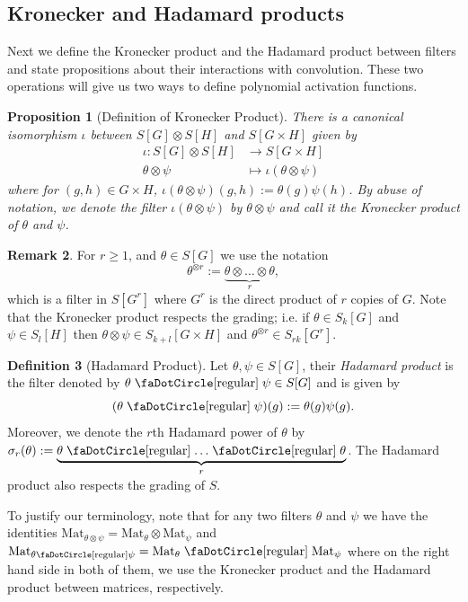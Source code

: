 \documentclass[final]{article}
\newcommand{\Mat}{\text{Mat}}
\newcommand{\circbd}{\mathrel{\text{\faDotCircle[regular]}}}
\theoremstyle{definition}
\newtheorem{definition}{Definition}[section] %
\newtheorem{remark}[definition]{Remark}
\theoremstyle{plain}
\newtheorem{proposition}[definition]{Proposition}
\begin{document}
\subsection{Kronecker and Hadamard products}
Next we define the Kronecker product and the Hadamard product between filters and state propositions about their interactions with convolution. 
These two operations will give us two ways to define polynomial activation functions.

\begin{proposition}[Definition of Kronecker Product]
    There is a canonical isomorphism $\iota$ between $S[G] \otimes S[H]$ and $S[G\times H]$ given by
    \begin{align*}
        \iota: S[G] \otimes S[H] &\to S[G \times H]\\
        \theta \otimes \psi &\mapsto \iota(\theta \otimes \psi)
    \end{align*}
    where for $(g, h)\in G\times H$, $\iota(\theta \otimes \psi)(g, h) := \theta(g)\psi(h)$. By abuse of notation, we denote the filter $\iota(\theta \otimes \psi)$ by $\theta \otimes \psi$ and call it the Kronecker product of $\theta$ and $\psi$. 
\end{proposition}

\begin{remark}
    For $r\geq 1$, and $\theta\in S[G]$ we use the notation 
\[
\theta^{\otimes r} := \underbrace{\theta \otimes \hdots \otimes \theta}_r ,
\]
which is a filter in $S[G^r]$ where $G^r$ is the direct product of $r$ copies of $G$.
Note that the Kronecker product respects the grading; i.e. if $\theta\in S_k[G]$ and $\psi \in S_l[H]$ then $\theta \otimes \psi \in S_{k+l}[G\times H]$ and $\theta^{\otimes r} \in S_{rk}[G^r]$.
\end{remark}





\begin{definition}[Hadamard Product]
Let $\theta, \psi \in S[G]$, their \emph{Hadamard product} is the filter denoted by $\theta \circbd \psi \in S[G]$ and is given by
    \[
    (\theta \circbd \psi)(g) := \theta(g)\psi(g).
    \]
    Moreover, we denote the $r$th Hadamard power of $\theta$ by $\sigma_r(\theta):= \underbrace{\theta \circbd \hdots \circbd \theta}_{r}$. The Hadamard product also respects the grading of $S$.
\end{definition}

To justify our terminology, note that for any two filters $\theta$ and $\psi$ we have the identities
$
\Mat_{\theta\otimes \psi} = \Mat_{\theta} \otimes \Mat_{\psi}
$
and
$
\Mat_{\theta\circbd \psi} = \Mat_{\theta} \circbd \Mat_{\psi}
$
where on the right hand side in both of them, we use the Kronecker product and the Hadamard product between matrices, respectively.
\end{document}

